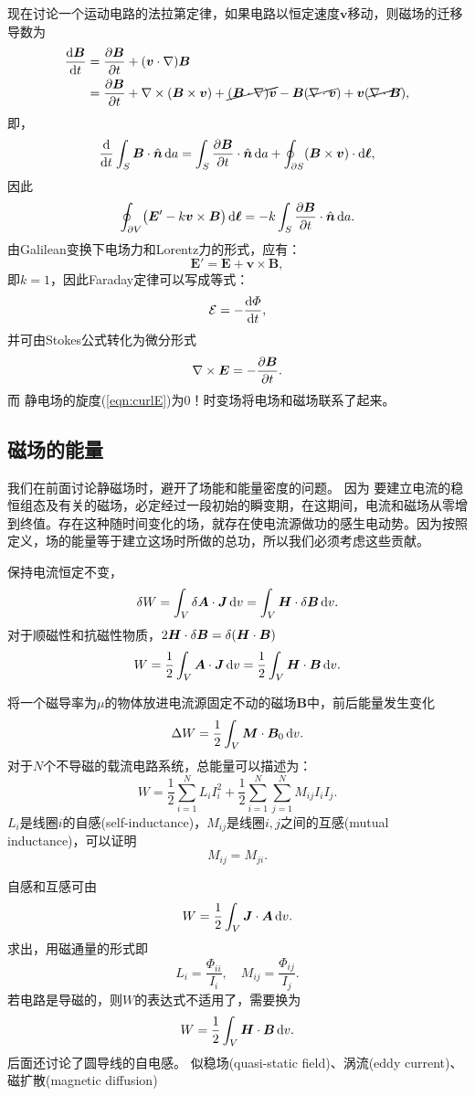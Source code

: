 现在讨论一个运动电路的法拉第定律，如果电路以恒定速度$\bm v$移动，则磁场的迁移导数为
\begin{align*}
    \dv{\bm B}t&=\pv{\bm B}t+(\bm v\cdot\nabla)\bm B\\
    &=\pv{\bm B}t+\curl(\bm B\times\bm v)+\cancel{(\bm B\cdot\nabla)\bm v}-\bm B(\cancel{\div\bm v})+\bm v(\cancel{\div\bm B}),
\end{align*}
即，
\begin{align*}
    \dd t\int_S\bm B\cdot\uvec n\d a=\int_S\pv{\bm B}t\cdot\uvec n\d a+\oint_{\p S}(\bm B\times\bm v)\cdot\d\bm\ell,
\end{align*}
因此 
\[
    \oint_{\partial V}\bigl(\bm E'-k\bm v\times\bm B\bigr)\mathop{}\!\mathrm{d}\bm\ell=-k\int_S\frac{\partial^{\;\!\!}\bm B}{\partial t^{\;\!\!}}\cdot\mathop{}\!\hat{\bm n}\mathop{}\!\mathrm{d} a.
\]
由Galilean变换下电场力和Lorentz力的形式，应有：
\[
    \bm E'=\bm E+\bm v\times\bm B,
\]
即$k=1$，因此Faraday定律可以写成等式：
\begin{equation}
    \label{eqn:Faraday}
    \mathcal{E}=-\frac{\mathrm{d}^{\;\!\!}\varPhi}{\mathrm{d} t^{\;\!\!}},
\end{equation}
并可由Stokes公式转化为微分形式
\begin{equation}
    \label{eqn:curlE-B}
    \nabla\times\bm E=-\frac{\partial^{\;\!\!}\bm B}{\partial t^{\;\!\!}}.
\end{equation}
而%
静电场的旋度(\ref{eqn:curlE})为0！时变场将电场和磁场联系了起来。
\subsection{磁场的能量}
我们在前面讨论静磁场时，避开了场能和能量密度的问题。
因为
要建立电流的稳恒组态及有关的磁场，必定经过一段初始的瞬变期，在这期间，电流和磁场从零增到终值。存在这种随时间变化的场，就存在使电流源做功的感生电动势。因为按照定义，场的能量等于建立这场时所做的总功，所以我们必须考虑这些贡献。

保持电流恒定不变，
\[
    \mathop{}\!\delta W=\int_V\mathop{}\!\delta\bm A\cdot\bm J\mathop{}\!\mathrm{d} v=\int_V\bm H\cdot\mathop{}\!\delta\bm B\mathop{}\!\mathrm{d} v.
\]
对于顺磁性和抗磁性物质，$2\bm H\cdot\mathop{}\!\delta\bm B=\mathop{}\!\delta(\bm H\cdot\bm B)$
\[
    W=\frac12\int_V\bm A\cdot\bm J\mathop{}\!\mathrm{d} v=\frac12\int_V\bm H\cdot\bm B\mathop{}\!\mathrm{d} v.
\]

将一个磁导率为$\mu$的物体放进电流源固定不动的磁场$\bm B$中，前后能量发生变化
\[
    \Delta W=\frac12\int_V\bm M\cdot\bm B_0\mathop{}\!\mathrm{d} v.
\]
对于$N$个不导磁的载流电路系统，总能量可以描述为：
\[
    W=\frac12\sum_{i=1}^NL_iI_i^2+\frac12\sum_{i=1}^N\sum_{j=1}^NM_{ij}I_iI_j.
\]
$L_i$是线圈$i$的自感(self-inductance)，$M_{ij}$是线圈$i,j$之间的互感(mutual inductance)，可以证明 
\[
    M_{ij}=M_{ji}.
\]

自感和互感可由
\[
    W=\frac12\int_V\bm J\cdot\bm A\mathop{}\!\mathrm{d} v.
\]
求出，用磁通量的形式即
\[
    L_i=\frac{\varPhi_{ii}}{I_i},\quad M_{ij}=\frac{\varPhi_{ij}}{I_j}.
\]
若电路是导磁的，则$W$的表达式不适用了，需要换为
\[
    W=\frac12\int_V\bm H\cdot\bm B\mathop{}\!\mathrm{d} v.
\]
后面还讨论了圆导线的自电感。
似稳场(quasi-static field)、涡流(eddy current)、磁扩散(magnetic diffusion)
\clearpage
